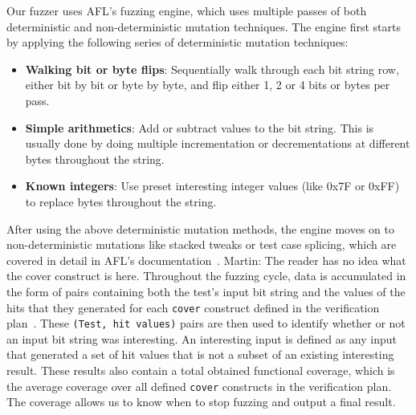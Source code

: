\documentclass[conference]{IEEEtran}
\newcommand{\todo}[1]{{\color{olive} TODO: #1}}
\newcommand{\martin}[1]{{\color{blue} Martin: #1}}
\begin{document}
Our fuzzer uses AFL's fuzzing engine, which uses multiple passes of both deterministic and non-deterministic mutation techniques.
The engine first starts by applying  the following series of deterministic mutation techniques:
\begin{itemize}
\item \textbf{Walking bit or byte flips}: Sequentially walk through each bit string row, either bit by bit or byte by byte, and flip either 1, 2 or 4 bits or bytes per pass.
\item \textbf{Simple arithmetics}: Add or subtract values to the bit string. This is usually done by doing multiple incrementation or decrementations at different bytes throughout the string.
\item \textbf{Known integers}: Use preset interesting integer values (like 0x7F or 0xFF) to replace bytes throughout the string.
\end{itemize}
After using the above deterministic mutation methods, the engine moves on to non-deterministic mutations like stacked tweaks or test case splicing, which are covered in detail in AFL's documentation~\cite{afl:fuzzingtechniques}.
\martin{The reader has no idea what the cover construct is here.}
Throughout the fuzzing cycle, data is accumulated in the form of pairs containing both the test's input bit string and the values of the hits that they generated for each \texttt{cover} construct defined in the verification plan~\cite{dobis2021opensource}.
These \texttt{(Test, hit values)} pairs are then used to identify whether or not an input bit string was interesting.
An interesting input is defined as any input that generated a set of hit values that is not a subset of an existing interesting result.
These results also contain a total obtained functional coverage, which is the average coverage over all defined \texttt{cover} constructs in the verification plan.
The coverage allows us to know when to stop fuzzing and output a final result.

\end{document}
